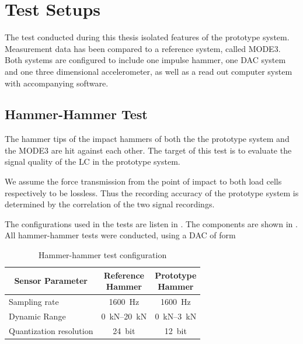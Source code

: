 \chapter{Test Setups%
  \label{chap:\currfilebase}}

The test conducted during this thesis isolated features of the prototype system. Measurement data has been compared to a reference system, called MODE3. Both systems are configured to include one impulse hammer, one \ac{DAC} system and one three dimensional accelerometer, as well as a read out computer system with accompanying software.

\section{Hammer-Hammer Test}

The hammer tips of the impact hammers of both the the prototype system and the MODE3 are hit against each other. The target of this test is to evaluate the signal quality of the \ac{LC} in the prototype system.

We assume the force transmission from the point of impact to both load cells respectively to be lossless. Thus the recording accuracy of the prototype system is determined by the correlation of the two signal recordings.

The configurations used in the tests are listen in . The components are shown in . All hammer-hammer tests were conducted, using a \ac{DAC} of form 

\begin{table}
  \centering
  {\renewcommand{\arraystretch}{1}%
  \footnotesize
  \begin{tabular}{lcc}
    \toprule
    \multicolumn{1}{c}{Sensor Parameter} & \makecell{Reference\\Hammer} & \makecell{Prototype\\Hammer}\\
    \midrule
    Sampling rate & \SI{1600}{\hertz} & \SI{1600}{\hertz}\\
    Dynamic Range & \SIrange{0}{20}{\kilo\newton} & \SIrange{0}{3}{\kilo\newton}\\
    Quantization resolution & \SI{24}{bit} & \SI{12}{bit}\\
    \bottomrule
  \end{tabular}
  \caption[Hammer-Hammer Test Configuration]{Hammer-hammer test configuration%
    \label{tab:hh_config}}
  \normalsize
  }
\end{table}

